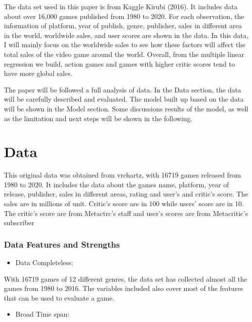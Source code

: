 \documentclass[
]{article}
\providecommand{\tightlist}{%
  \setlength{\itemsep}{0pt}\setlength{\parskip}{0pt}}
\begin{document}
The data set used in this paper is from Kaggle Kirubi (2016). It
includes data about over 16,000 games published from 1980 to 2020. For
each observation, the information of platform, year of publish, genre,
publisher, sales in different area in the world, worldwide sales, and
user scores are shown in the data. In this data, I will mainly focus on
the worldwide sales to see how these factors will affect the total sales
of the video game around the world. Overall, from the multiple linear
regression we build, action games and games with higher critic scores
tend to have more global sales.

The paper will be followed a full analysis of data. In the Data section,
the data will be carefully described and evaluated. The model built up
based on the data will be shown in the Model section. Some discussions
results of the model, as well as the limitation and next steps will be
shown in the following.

\hypertarget{data}{%
\section{Data}\label{data}}

This original data was obtained from vrchartz, with 16719 games released
from 1980 to 2020. It includes the data about the games name, platform,
year of release, publisher, sales in different areas, rating and user's
and critic's score. The sales are in millions of unit. Critic's score
are in 100 while users' score are in 10. The critic's score are from
Metactrc's staff and user's scores are from Metacritic's subscriber

\hypertarget{data-features-and-strengths}{%
\subsubsection{Data Features and
Strengths}\label{data-features-and-strengths}}

\begin{itemize}
\tightlist
\item
  Data Completeless:
\end{itemize}

With 16719 games of 12 different genres, the data set has collected
almost all the games from 1980 to 2016. The variables included also
cover most of the features that can be used to evaluate a game.

\begin{itemize}
\tightlist
\item
  Broad Time span:
\end{itemize}
\end{document}
